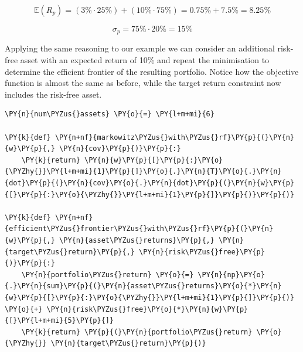 \[ \mathbb{E}(R_p) = (3\% \cdot 25\%) + (10\% \cdot 75\%) = 0.75\% + 7.5\% = 8.25\% \]

\[ \sigma_p = 75\% \cdot 20\% = 15\% \]

Applying the same reasoning to our example we can consider an additional
risk-free asset with an expected return of 10\% and repeat the
minimisation to determine the efficient frontier of the resulting
portfolio. Notice how the objective function is almost the same as before, 
while the target return constraint now includes the risk-free asset.

\begin{codebox}
\begin{Verbatim}[commandchars=\\\{\}]
\PY{n}{num\PYZus{}assets} \PY{o}{=} \PY{l+m+mi}{6}
		
\PY{k}{def} \PY{n+nf}{markowitz\PYZus{}with\PYZus{}rf}\PY{p}{(}\PY{n}{w}\PY{p}{,} \PY{n}{cov}\PY{p}{)}\PY{p}{:}
    \PY{k}{return} \PY{n}{w}\PY{p}{[}\PY{p}{:}\PY{o}{\PYZhy{}}\PY{l+m+mi}{1}\PY{p}{]}\PY{o}{.}\PY{n}{T}\PY{o}{.}\PY{n}{dot}\PY{p}{(}\PY{n}{cov}\PY{o}{.}\PY{n}{dot}\PY{p}{(}\PY{n}{w}\PY{p}{[}\PY{p}{:}\PY{o}{\PYZhy{}}\PY{l+m+mi}{1}\PY{p}{]}\PY{p}{)}\PY{p}{)}
		
\PY{k}{def} \PY{n+nf}{efficient\PYZus{}frontier\PYZus{}with\PYZus{}rf}\PY{p}{(}\PY{n}{w}\PY{p}{,} \PY{n}{asset\PYZus{}returns}\PY{p}{,} \PY{n}{target\PYZus{}return}\PY{p}{,} \PY{n}{risk\PYZus{}free}\PY{p}{)}\PY{p}{:} 
    \PY{n}{portfolio\PYZus{}return} \PY{o}{=} \PY{n}{np}\PY{o}{.}\PY{n}{sum}\PY{p}{(}\PY{n}{asset\PYZus{}returns}\PY{o}{*}\PY{n}{w}\PY{p}{[}\PY{p}{:}\PY{o}{\PYZhy{}}\PY{l+m+mi}{1}\PY{p}{]}\PY{p}{)} \PY{o}{+} \PY{n}{risk\PYZus{}free}\PY{o}{*}\PY{n}{w}\PY{p}{[}\PY{l+m+mi}{5}\PY{p}{]} 
    \PY{k}{return} \PY{p}{(}\PY{n}{portfolio\PYZus{}return} \PY{o}{\PYZhy{}} \PY{n}{target\PYZus{}return}\PY{p}{)}
	

\end{Verbatim}
\end{codebox}
